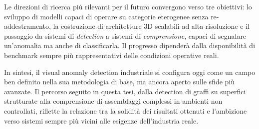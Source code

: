 \medskip

Le direzioni di ricerca più rilevanti per il futuro convergono verso tre obiettivi: lo sviluppo di modelli capaci di operare su categorie eterogenee senza re-addestramento, la costruzione di architetture 3D scalabili ad alta risoluzione e il passaggio da sistemi di \textit{detection} a sistemi di \textit{comprensione}, capaci di segnalare un'anomalia ma anche di classificarla. 
Il progresso dipenderà dalla disponibilità di benchmark sempre più rappresentativi delle condizioni operative reali.

\medskip

In sintesi, il visual anomaly detection industriale si configura oggi come un campo ben definito nella sua metodologia di base, ma ancora aperto sulle sfide più avanzate. 
Il percorso seguito in questa tesi, dalla detection di graffi su superfici strutturate alla comprensione di assemblaggi complessi in ambienti non controllati, riflette la relazione tra la solidità dei risultati ottenuti e l'ambizione verso sistemi sempre più vicini alle esigenze dell'industria reale.
